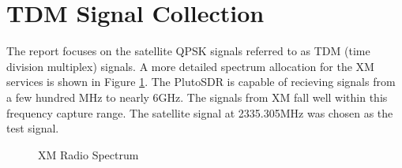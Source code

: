 \documentclass[conference,onecolumn]{IEEEtran}
\begin{document}
\section{TDM Signal Collection} The report focuses on the satellite QPSK signals referred to as TDM (time division multiplex) signals. A more detailed spectrum allocation for the XM services is shown in Figure \ref{fig::xm_spectrum}.  The PlutoSDR is capable of recieving signals from a few hundred MHz to nearly 6GHz.  The signals from XM fall well within this frequency capture range.  The satellite signal at 2335.305MHz was chosen as the test signal.  \\

\begin{figure}[H]
	\centerline{}
	\caption{XM Radio Spectrum \cite{a1999_us6724827b1}}
	\label{fig::xm_spectrum}
\end{figure}
\end{document}
